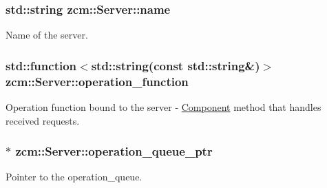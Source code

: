 \subsubsection[{\texorpdfstring{name}{name}}]{\setlength{\rightskip}{0pt plus 5cm}std\+::string zcm\+::\+Server\+::name\hspace{0.3cm}{\ttfamily [private]}}\hypertarget{classzcm_1_1Server_a9d59737b196a7abb3a891dc8723e0dcf}{}\label{classzcm_1_1Server_a9d59737b196a7abb3a891dc8723e0dcf}


Name of the server. 

\subsubsection[{\texorpdfstring{operation\+\_\+function}{operation_function}}]{\setlength{\rightskip}{0pt plus 5cm}std\+::function$<$std\+::string(const std\+::string\&)$>$ zcm\+::\+Server\+::operation\+\_\+function\hspace{0.3cm}{\ttfamily [private]}}\hypertarget{classzcm_1_1Server_a287609eb19370fe01adf47f26633ce01}{}\label{classzcm_1_1Server_a287609eb19370fe01adf47f26633ce01}


Operation function bound to the server -\/ \hyperlink{classzcm_1_1Component}{Component} method that handles received requests. 

\subsubsection[{\texorpdfstring{operation\+\_\+queue\+\_\+ptr}{operation_queue_ptr}}]{$\ast$ zcm\+::\+Server\+::operation\+\_\+queue\+\_\+ptr\hspace{0.3cm}{\ttfamily [private]}}\hypertarget{classzcm_1_1Server_a667c0fef537aa6acc6245d956250c860}{}\label{classzcm_1_1Server_a667c0fef537aa6acc6245d956250c860}


Pointer to the operation\+\_\+queue. 

